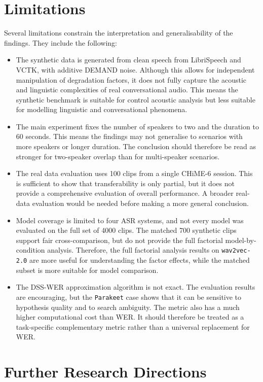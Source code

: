 \section{Limitations}
Several limitations constrain the interpretation and generalisability of the findings. They include the following:
\begin{itemize}
    \item The synthetic data is generated from clean speech from LibriSpeech and VCTK, with additive DEMAND noise. Although this allows for independent manipulation of degradation factors, it does not fully capture the acoustic and linguistic complexities of real conversational audio. This means the synthetic benchmark is suitable for control acoustic analysis but less suitable for modelling linguistic and conversational phenomena.
    \item The main experiment fixes the number of speakers to two and the duration to 60 seconds. This means the findings may not generalise to scenarios with more speakers or longer duration. The conclusion should therefore be read as stronger for two-speaker overlap than for multi-speaker scenarios.
    \item The real data evaluation uses 100 clips from a single CHiME-6 session. This is sufficient to show that transferability is only partial, but it does not provide a comprehensive evaluation of overall performance. A broader real-data evaluation would be needed before making a more general conclusion.
    \item Model coverage is limited to four ASR systems, and not every model was evaluated on the full set of 4000 clips. The matched 700 synthetic clips support fair cross-comparison, but do not provide the full factorial model-by-condition analysis. Therefore, the full factorial analysis results on \texttt{wav2vec-2.0} are more useful for understanding the factor effects, while the matched subset is more suitable for model comparison.
    \item The DSS-WER approximation algorithm is not exact. The evaluation results are encouraging, but the \texttt{Parakeet} case shows that it can be sensitive to hypothesis quality and to search ambiguity. The metric also has a much higher computational cost than WER. It should therefore be treated as a task-specific complementary metric rather than a universal replacement for WER.
\end{itemize}

\section{Further Research Directions}
